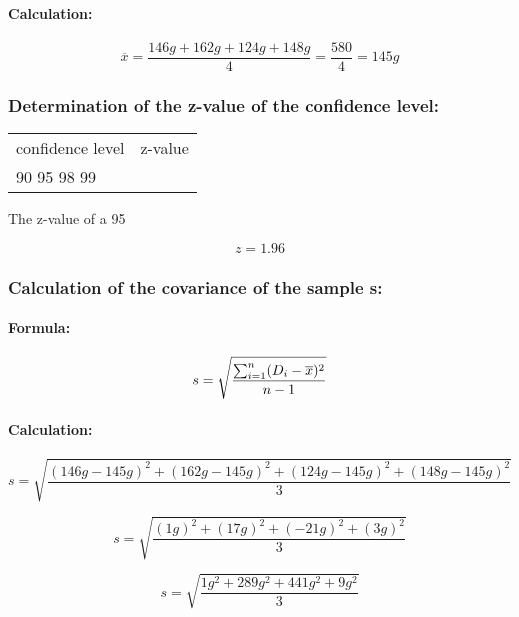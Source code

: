 \documentclass[a4paper,13pt,twoside]{book}
\begin{document}
\paragraph{Calculation:}

$$
\overline{x} =
\frac
{146 g + 162 g + 124 g + 148 g}
{4} =
\frac
{580}
{4} =
145 g
$$



\subsubsection{Determination of the z-value of the confidence level:}

\begin{tabular}{ll}
confidence level & z-value \\
90%
95%
98%
99%
\end{tabular}

The z-value of a 95 %

$$
z = 1.96
$$



\subsubsection{Calculation of the covariance of the sample s:}

\paragraph{Formula:}

$$
s =
\sqrt
{
\frac
{\sum_{i=1}^{\\n} (D_i - \overline{x})^{2}}
{n - 1}
}
$$

\paragraph{Calculation:}

$$
s =
\sqrt
{
\frac
{
(146 g - 145 g)^{2} +
(162 g - 145 g)^{2} +
(124 g - 145 g)^{2} +
(148 g - 145 g)^{2}
}
{3}
}
$$

$$
s =
\sqrt
{
\frac
{
(1    g)^{2} +
(17   g)^{2} +
(- 21 g)^{2} +
(3    g)^{2}
}
{3}
}
$$

$$
s =
\sqrt
{
\frac
{
1   g^{2} +
289 g^{2} +
441 g^{2} +
9   g^{2}
}
{3}
}
$$
\end{document}
